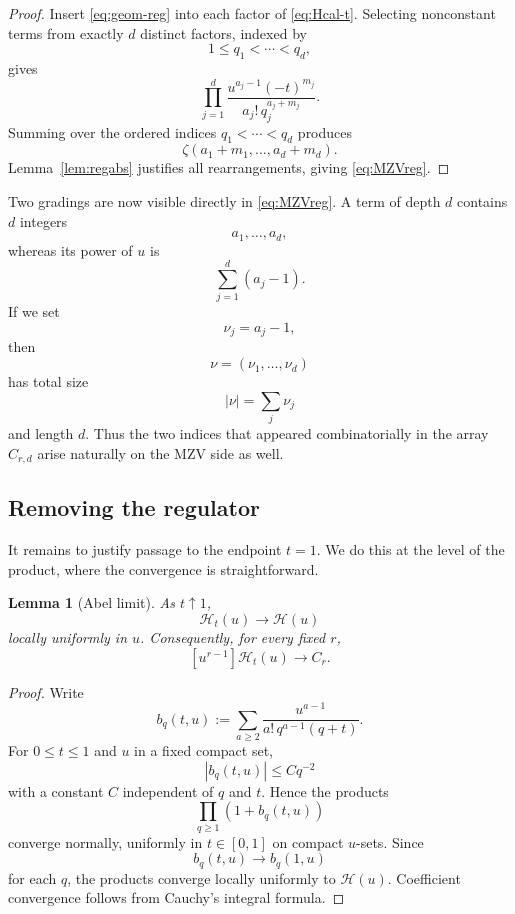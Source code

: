 \documentclass[11pt]{article}
\newtheorem{lemma}[theorem]{Lemma}
\theoremstyle{definition}
\begin{document}
\begin{proof}
Insert \eqref{eq:geom-reg} into each factor of
\eqref{eq:Hcal-t}.  Selecting nonconstant terms from exactly $d$
distinct factors, indexed by
\[
        1\leq q_1<\cdots<q_d,
\]
gives
\[
 \prod_{j=1}^d
 \frac{u^{a_j-1}(-t)^{m_j}}
 {a_j!\,q_j^{a_j+m_j}}.
\]
Summing over the ordered indices $q_1<\cdots<q_d$ produces
\[
        \zeta(a_1+m_1,\ldots,a_d+m_d).
\]
Lemma~\ref{lem:regabs} justifies all rearrangements, giving
\eqref{eq:MZVreg}.
\end{proof}

Two gradings are now visible directly in \eqref{eq:MZVreg}.  A term
of depth $d$ contains $d$ integers
\[
        a_1,\ldots,a_d,
\]
whereas its power of $u$ is
\[
        \sum_{j=1}^d(a_j-1).
\]
If we set
\[
        \nu_j=a_j-1,
\]
then
\[
        \nu=(\nu_1,\ldots,\nu_d)
\]
has total size
\[
        |\nu|=\sum_j\nu_j
\]
and length $d$.  Thus the two indices that appeared combinatorially
in the array $C_{r,d}$ arise naturally on the MZV side as well.

\subsection{Removing the regulator}

It remains to justify passage to the endpoint $t=1$.  We do this at
the level of the product, where the convergence is straightforward.

\begin{lemma}[Abel limit]\label{lem:Abel}
As $t\uparrow1$,
\[
        \mathcal H_t(u)\longrightarrow\mathcal H(u)
\]
locally uniformly in $u$.  Consequently, for every fixed $r$,
\begin{equation}\label{eq:Abel-Cr}
        [u^{r-1}]\mathcal H_t(u)
        \longrightarrow C_r.
\end{equation}
\end{lemma}

\begin{proof}
Write
\[
 b_q(t,u)
 :=
 \sum_{a\geq2}
 \frac{u^{a-1}}
 {a!\,q^{a-1}(q+t)}.
\]
For $0\leq t\leq1$ and $u$ in a fixed compact set,
\[
        |b_q(t,u)|\leq Cq^{-2}
\]
with a constant $C$ independent of $q$ and $t$.  Hence the products
\[
        \prod_{q\geq1}(1+b_q(t,u))
\]
converge normally, uniformly in $t\in[0,1]$ on compact $u$-sets.
Since
\[
        b_q(t,u)\longrightarrow b_q(1,u)
\]
for each $q$, the products converge locally uniformly to
$\mathcal H(u)$.  Coefficient convergence follows from Cauchy's
integral formula.
\end{proof}
\end{document}
